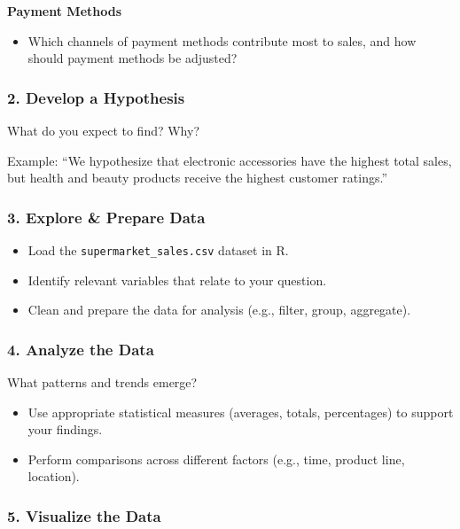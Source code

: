 \documentclass[
  11pt,
]{article}
\providecommand{\tightlist}{%
  \setlength{\itemsep}{0pt}\setlength{\parskip}{0pt}}
\begin{document}
\textbf{Payment Methods}

\begin{itemize}
\tightlist
\item
  Which channels of payment methods contribute most to sales, and how
  should payment methods be adjusted?
\end{itemize}

\subsubsection{2. Develop a Hypothesis}\label{develop-a-hypothesis}

What do you expect to find? Why?

Example: ``We hypothesize that electronic accessories have the highest
total sales, but health and beauty products receive the highest customer
ratings.''

\subsubsection{3. Explore \& Prepare Data}\label{explore-prepare-data}

\begin{itemize}
\item
  Load the \texttt{supermarket\_sales.csv} dataset in R.
\item
  Identify relevant variables that relate to your question.
\item
  Clean and prepare the data for analysis (e.g., filter, group,
  aggregate).
\end{itemize}

\subsubsection{4. Analyze the Data}\label{analyze-the-data}

What patterns and trends emerge?

\begin{itemize}
\item
  Use appropriate statistical measures (averages, totals, percentages)
  to support your findings.
\item
  Perform comparisons across different factors (e.g., time, product
  line, location).
\end{itemize}

\subsubsection{5. Visualize the Data}\label{visualize-the-data}
\end{document}
